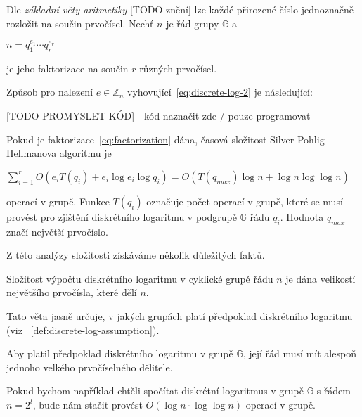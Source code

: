 \documentclass[
  program=infoi,
  biblatex,
  figures=false,
  glossaries,
  index
]{kidiplom}
\begin{document}
            Dle \emph{základní věty aritmetiky} [TODO znění] lze každé přirozené číslo jednoznačně rozložit na součin prvočísel.
            Nechť $n$ je řád grupy $\mathbb{G}$ a

            \begin{center}\label{eq:factorization}
                $n=q_1^{e_1} \cdots q_r^{e_r}$
            \end{center}

            je jeho faktorizace na součin $r$ různých prvočísel.

            Způsob pro nalezení $e \in \mathbb{Z}_n$ vyhovující~\ref{eq:discrete-log-2} je následující:

            
            [TODO PROMYSLET KÓD] - kód naznačit zde / pouze programovat


            Pokud je faktorizace~\ref{eq:factorization} dána, časová složitost Silver-Pohlig-Hellmanova algoritmu je

                \begin{center}
                    $\sum_{i=1}^r O(e_i T(q_i) + e_i \log{e_i} \log{q_i}) = O(T(q_{max}) \log{n} + \log{n} \log \log{n})$
                \end{center}
            
            operací v grupě.
            Funkce $T(q_i)$ označuje počet operací v grupě, které se musí provést pro zjištění diskrétního logaritmu
            v podgrupě $\mathbb{G}$ řádu $q_i$. Hodnota $q_{max}$ značí největší prvočíslo.

            Z této analýzy složitosti získáváme několik důležitých faktů.

            \begin{theorem}\label{the:sph-complexity}
                Složitost výpočtu diskrétního logaritmu v cyklické grupě řádu $n$ je dána velikostí největšího prvočísla, které dělí $n$.
            \end{theorem}

            Tato věta jasně určuje, v jakých grupách platí předpoklad diskrétního logaritmu (viz ~\ref{def:discrete-log-assumption}).

            \begin{consequence}
                Aby platil předpoklad diskrétního logaritmu v grupě $\mathbb{G}$, její řád musí mít alespoň
                jednoho velkého prvočíselného dělitele.
            \end{consequence}

            Pokud bychom například chtěli spočítat diskrétní logaritmus v grupě $\mathbb{G}$ s řádem $n = 2^l$, bude
            nám stačit provést $O(\log n \cdot \log \log n)$ operací v grupě.
\end{document}
